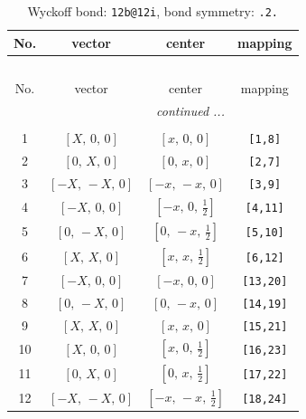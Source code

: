 \documentclass[fleqn,8pt]{jsarticle}
\begin{document}
\begin{longtable}{cccc}
\caption{Wyckoff bond: {\tt 12b@12i}, bond symmetry: {\tt .2.}}
 \\
 \hline \hline
No. & vector & center & mapping \\ \hline \endfirsthead

\multicolumn{3}{l}{\tablename\ \thetable{}} \\
 \hline \hline
No. & vector & center & mapping \\ \hline \endhead

 \hline \hline
\multicolumn{3}{r}{\footnotesize\it continued ...} \\ \endfoot

 \hline \hline
\multicolumn{3}{r}{} \\ \endlastfoot

1 & $\left[ X,\, 0,\, 0 \right]$ & $\left[ x,\, 0,\, 0 \right]$ & {\tt [1,8]} \\ \hline
2 & $\left[ 0,\, X,\, 0 \right]$ & $\left[ 0,\, x,\, 0 \right]$ & {\tt [2,7]} \\ \hline
3 & $\left[ - X,\, - X,\, 0 \right]$ & $\left[ - x,\, - x,\, 0 \right]$ & {\tt [3,9]} \\ \hline
4 & $\left[ - X,\, 0,\, 0 \right]$ & $\left[ - x,\, 0,\, \frac{1}{2} \right]$ & {\tt [4,11]} \\ \hline
5 & $\left[ 0,\, - X,\, 0 \right]$ & $\left[ 0,\, - x,\, \frac{1}{2} \right]$ & {\tt [5,10]} \\ \hline
6 & $\left[ X,\, X,\, 0 \right]$ & $\left[ x,\, x,\, \frac{1}{2} \right]$ & {\tt [6,12]} \\ \hline
7 & $\left[ - X,\, 0,\, 0 \right]$ & $\left[ - x,\, 0,\, 0 \right]$ & {\tt [13,20]} \\ \hline
8 & $\left[ 0,\, - X,\, 0 \right]$ & $\left[ 0,\, - x,\, 0 \right]$ & {\tt [14,19]} \\ \hline
9 & $\left[ X,\, X,\, 0 \right]$ & $\left[ x,\, x,\, 0 \right]$ & {\tt [15,21]} \\ \hline
10 & $\left[ X,\, 0,\, 0 \right]$ & $\left[ x,\, 0,\, \frac{1}{2} \right]$ & {\tt [16,23]} \\ \hline
11 & $\left[ 0,\, X,\, 0 \right]$ & $\left[ 0,\, x,\, \frac{1}{2} \right]$ & {\tt [17,22]} \\ \hline
12 & $\left[ - X,\, - X,\, 0 \right]$ & $\left[ - x,\, - x,\, \frac{1}{2} \right]$ & {\tt [18,24]} \\
\end{longtable}
\renewcommand{\arraystretch}{1.2}
\end{document}
